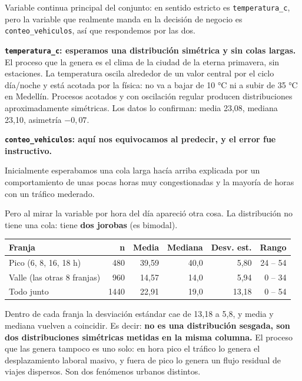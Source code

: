 \documentclass[11pt]{article}
\begin{document}
\begin{respuesta}[Respuesta 1.4]
Variable continua principal del conjunto: en sentido estricto es \texttt{temperatura\_c}, pero la variable que realmente manda en la decisión de negocio es \texttt{conteo\_vehiculos}, así que respondemos por las dos.

\medskip
\noindent\textbf{\texttt{temperatura\_c}: esperamos una distribución simétrica y sin colas largas.}
El proceso que la genera es el clima de la ciudad de la eterna primavera, sin estaciones. La temperatura oscila alrededor de un valor central por el ciclo día/noche y está acotada por la física: no va a bajar de 10 °C ni a subir de 35 °C en Medellín. Procesos acotados y con oscilación regular producen distribuciones aproximadamente simétricas. Los datos lo confirman: media 23,08, mediana 23,10, asimetría $-0{,}07$.

\medskip
\noindent\textbf{\texttt{conteo\_vehiculos}: aquí nos equivocamos al predecir, y el error fue instructivo.}

Inicialmente esperabamos una cola larga hacía arriba explicada por un comportamiento de unas pocas horas muy congestionadas y la mayoría de horas con un tráfico mederado.

Pero al mirar la variable por hora del día apareció otra cosa. La distribución no tiene una cola: tiene \textbf{dos jorobas} (es bimodal).

\begin{center}
\begin{tabular}{lrrrrr}
\toprule
Franja & n & Media & Mediana & Desv. est. & Rango \\
\midrule
Pico (6, 8, 16, 18 h) & 480 & 39,59 & 40,0 & 5,80 & 24 -- 54 \\
Valle (las otras 8 franjas) & 960 & 14,57 & 14,0 & 5,94 & 0 -- 34 \\
\midrule
Todo junto & 1440 & 22,91 & 19,0 & 13,18 & 0 -- 54 \\
\bottomrule
\end{tabular}
\end{center}

Dentro de cada franja la desviación estándar cae de 13,18 a 5,8, y media y mediana vuelven a coincidir. Es decir: \textbf{no es una distribución sesgada, son dos distribuciones simétricas metidas en la misma columna.} El proceso que las genera tampoco es uno solo: en hora pico el tráfico lo genera el desplazamiento laboral masivo, y fuera de pico lo genera un flujo residual de viajes dispersos. Son dos fenómenos urbanos distintos.


\end{respuesta}
\end{document}
